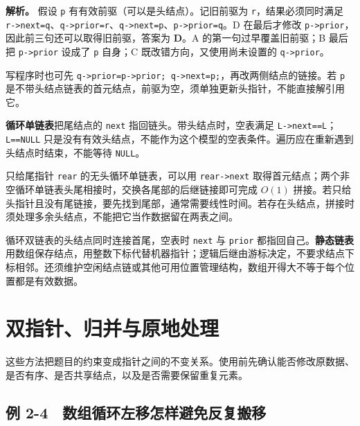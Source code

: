 
\textbf{解析。} 假设 \allowbreak{}\texttt{p} 有有效前驱（可以是头结点）。记旧前驱为 \allowbreak{}\texttt{r}，结果必须同时满足 \allowbreak{}\texttt{r-\textgreater{}next=q}、\allowbreak{}\texttt{q-\textgreater{}prior=r}、\allowbreak{}\texttt{q-\textgreater{}next=p}、\allowbreak{}\texttt{p-\textgreater{}prior=q}。D 在最后才修改 \allowbreak{}\texttt{p-\textgreater{}prior}，因此前三句还可以取得旧前驱，答案为 \textbf{D}。A 的第一句过早覆盖旧前驱；B 最后把 \allowbreak{}\texttt{p-\textgreater{}prior} 设成了 \allowbreak{}\texttt{p} 自身；C 既改错方向，又使用尚未设置的 \allowbreak{}\texttt{q-\textgreater{}prior}。

写程序时也可先 \allowbreak{}\texttt{q-\textgreater{}prior=p-\textgreater{}prior;}\allowbreak{}\texttt{\ q-\textgreater{}next=p;}\allowbreak{}，再改两侧结点的链接。若 \allowbreak{}\texttt{p} 是不带头结点链表的首元结点，前驱为空，须单独更新头指针，不能直接解引用它。

\textbf{循环单链表}把尾结点的 \allowbreak{}\texttt{next} 指回链头。带头结点时，空表满足 \allowbreak{}\texttt{L-\textgreater{}next==L}；\allowbreak{}\texttt{L==NULL} 只是没有有效头结点，不能作为这个模型的空表条件。遍历应在重新遇到头结点时结束，不能等待 \allowbreak{}\texttt{NULL}。

只给尾指针 \allowbreak{}\texttt{rear} 的无头循环单链表，可以用 \allowbreak{}\texttt{rear-\textgreater{}next} 取得首元结点；两个非空循环单链表头尾相接时，交换各尾部的后继链接即可完成 \(O(1)\) 拼接。若只给头指针且没有尾链接，要先找到尾部，通常需要线性时间。若存在头结点，拼接时须处理多余头结点，不能把它当作数据留在两表之间。

循环双链表的头结点同时连接首尾，空表时 \allowbreak{}\texttt{next} 与 \allowbreak{}\texttt{prior} 都指回自己。\textbf{静态链表}用数组保存结点，用整数下标代替机器指针；逻辑后继由游标决定，不要求结点下标相邻。还须维护空闲结点链或其他可用位置管理结构，数组开得大不等于每个位置都是有效数据。

\section{双指针、归并与原地处理}\label{ds-02-05}

这些方法把题目的约束变成指针之间的不变关系。使用前先确认能否修改原数据、是否有序、是否共享结点，以及是否需要保留重复元素。

\subsection{例 2-4　数组循环左移怎样避免反复搬移}\label{ds-ex2-4}

